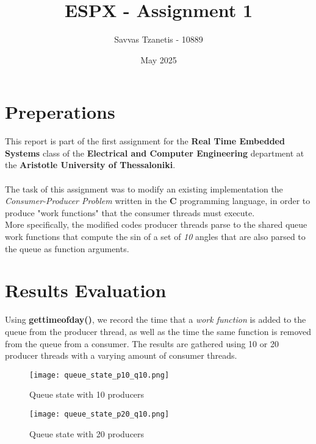 \documentclass[12pt]{article}
\title{\textbf{ESPX - Assignment 1}}
\author{Savvas Tzanetis - 10889}
\date{May 2025}
\begin{document}
\maketitle

\section{Preperations}
This report is part of the first assignment for the \textbf{Real Time Embedded Systems} class of the \textbf{Electrical and Computer Engineering} department at the \textbf{Aristotle University of Thessaloniki}.

\paragraph{}
The task of this assignment was to modify an existing implementation the \textit{Consumer-Producer Problem} written in the \textbf{C} programming language, in order to produce "work functions" that the consumer threads must execute. \\
More specifically, the modified codes producer threads parse to the shared queue work functions that compute the sin of a set of \textit{10} angles that are also parsed to the queue as function arguments.

\section{Results Evaluation}
Using \textbf{gettimeofday()}, we record the time that a \textit{work function} is added to the queue from the producer thread, as well as the time the same function is removed from the queue from a consumer. The results are gathered using 10 or 20 producer threads with a varying amount of consumer threads.

\begin{figure}[!h]
    \centering
    \begin{minipage}{0.48\textwidth}
        \centering
        \texttt{[image: queue\_state\_p10\_q10.png]}
        \caption{Queue state with 10 producers}
        \label{fig:queue-p10}
    \end{minipage}%
    \hfill
    \begin{minipage}{0.48\textwidth}
        \centering
        \texttt{[image: queue\_state\_p20\_q10.png]}
        \caption{Queue state with 20 producers}
        \label{fig:queue-p20}
    \end{minipage}
\end{figure}
\end{document}

